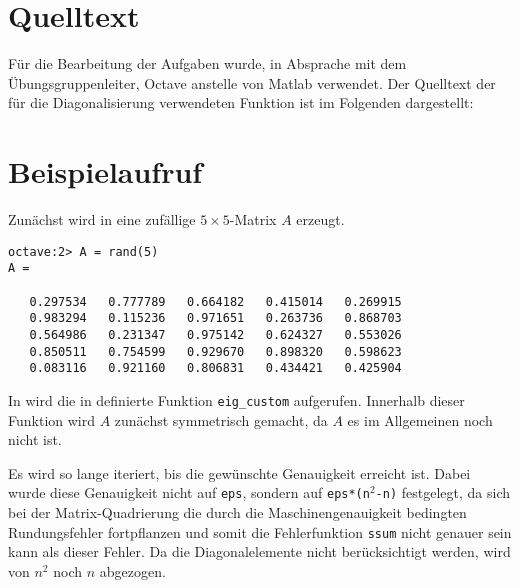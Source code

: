 \section*{Quelltext}
Für die Bearbeitung der Aufgaben wurde, in Absprache mit dem
Übungsgruppenleiter, Octave anstelle von Matlab verwendet. Der Quelltext der für
die Diagonalisierung verwendeten Funktion ist im Folgenden dargestellt:


\section*{Beispielaufruf}
Zunächst wird in  eine zufällige $5\times 5$-Matrix $A$
erzeugt.
\begin{lstlisting}[caption=Erzeugung einer Zufallsmatrix der
Dimension $5\times 5$,label=lst:rand_matrix]
octave:2> A = rand(5)
A =

   0.297534   0.777789   0.664182   0.415014   0.269915
   0.983294   0.115236   0.971651   0.263736   0.868703
   0.564986   0.231347   0.975142   0.624327   0.553026
   0.850511   0.754599   0.929670   0.898320   0.598623
   0.083116   0.921160   0.806831   0.434421   0.425904
\end{lstlisting}
In  wird die in  definierte Funktion
\texttt{eig\_custom} aufgerufen. Innerhalb dieser Funktion wird $A$ zunächst
symmetrisch gemacht, da $A$ es im Allgemeinen noch nicht ist.

Es wird so lange iteriert, bis die gewünschte Genauigkeit erreicht ist. Dabei
wurde diese Genauigkeit nicht auf \texttt{eps}, sondern auf
\texttt{eps*(n$^2$-n)} festgelegt, da sich bei der Matrix-Quadrierung die
durch die Maschinengenauigkeit bedingten Rundungsfehler fortpflanzen und somit
die Fehlerfunktion \texttt{ssum} nicht genauer sein kann als dieser Fehler. Da
die Diagonalelemente nicht berücksichtigt werden, wird von $n^2$ noch $n$
abgezogen.

